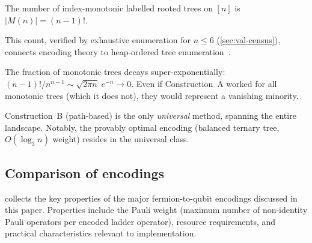 \begin{proposition}
\label{prop:monotonic-count}
The number of index-monotonic labelled rooted trees on $[n]$ is
$|M(n)| = (n{-}1)!$.
\end{proposition}

This count, verified by exhaustive enumeration for $n \le 6$
(\cref{sec:val-census}), connects encoding theory to heap-ordered
tree enumeration~\cite{bergeron1992}.

\begin{corollary}
The fraction of monotonic trees decays super-exponentially:
$(n{-}1)!/n^{n-1} \sim \sqrt{2\pi n}\;e^{-n} \to 0$.
Even if Construction~A worked for all monotonic trees (which it does
not), they would represent a vanishing minority.
\end{corollary}

Construction~B (path-based) is the only \emph{universal} method,
spanning the entire landscape.  Notably, the provably optimal encoding
(balanced ternary tree, $O(\log_3 n)$ weight) resides in the universal
class.

\subsection{Comparison of encodings}
\label{sec:encoding-comparison}

 collects the key properties of the
major fermion-to-qubit encodings discussed in this paper.  Properties
include the Pauli weight (maximum number of non-identity Pauli
operators per encoded ladder operator), resource requirements, and
practical characteristics relevant to implementation.

